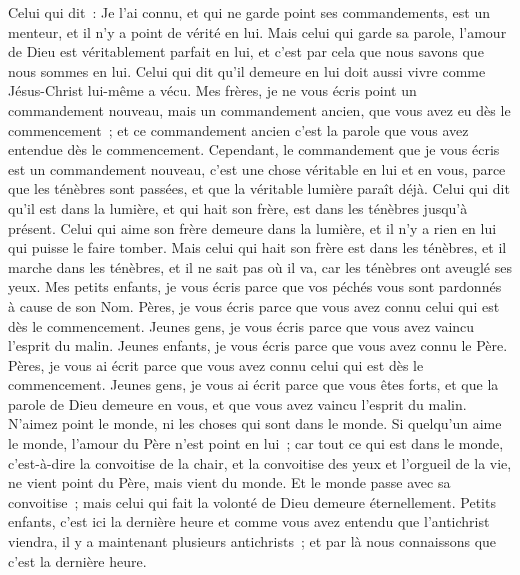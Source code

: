 \begin{multicols}{2}
Celui qui dit~: Je l'ai connu, et qui ne garde point ses commandements, est un menteur, et il n'y a point de vérité en lui.
Mais celui qui garde sa parole, l'amour de Dieu est véritablement parfait en lui, et c'est par cela que nous savons que nous sommes en lui.
Celui qui dit qu'il demeure en lui doit aussi vivre comme Jésus-Christ lui-même a vécu.
Mes frères, je ne vous écris point un commandement nouveau, mais un commandement ancien, que vous avez eu dès le commencement~; et ce commandement ancien c'est la parole que vous avez entendue dès le commencement.
Cependant, le commandement que je vous écris est un commandement nouveau, c'est une chose véritable en lui et en vous, parce que les ténèbres sont passées, et que la véritable lumière paraît déjà.
Celui qui dit qu'il est dans la lumière, et qui hait son frère, est dans les ténèbres jusqu'à présent.
Celui qui aime son frère demeure dans la lumière, et il n'y a rien en lui qui puisse le faire tomber.
Mais celui qui hait son frère est dans les ténèbres, et il marche dans les ténèbres, et il ne sait pas où il va, car les ténèbres ont aveuglé ses yeux.
Mes petits enfants, je vous écris parce que vos péchés vous sont pardonnés à cause de son Nom.
Pères, je vous écris parce que vous avez connu celui qui est dès le commencement. Jeunes gens, je vous écris parce que vous avez vaincu l'esprit du malin.
Jeunes enfants, je vous écris parce que vous avez connu le Père. Pères, je vous ai écrit parce que vous avez connu celui qui est dès le commencement. Jeunes gens, je vous ai écrit parce que vous êtes forts, et que la parole de Dieu demeure en vous, et que vous avez vaincu l'esprit du malin.
N'aimez point le monde, ni les choses qui sont dans le monde. Si quelqu'un aime le monde, l'amour du Père n'est point en lui~;
car tout ce qui est dans le monde, c'est-à-dire la convoitise de la chair, et la convoitise des yeux et l'orgueil de la vie, ne vient point du Père, mais vient du monde.
Et le monde passe avec sa convoitise~; mais celui qui fait la volonté de Dieu demeure éternellement.
Petits enfants, c'est ici la dernière heure et comme vous avez entendu que l'antichrist viendra, il y a maintenant plusieurs antichrists~; et par là nous connaissons que c'est la dernière heure.

\end{multicols}
